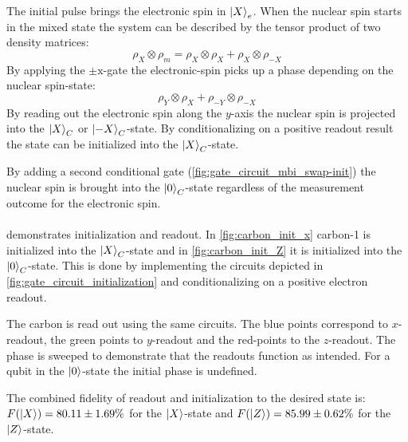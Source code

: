 The initial pulse brings the electronic spin in ${\left\vert{X}\right\rangle}_e$.
When the nuclear spin starts in the mixed state the system can be described by the tensor product of two density matrices:
\begin{equation}
    \rho_X \otimes \rho_m = \rho_X \otimes \rho_{X} +\rho_X \otimes \rho_{-X}
\end{equation}
By applying the $\pm{\mathrm{x}}$-gate  the electronic-spin picks up a phase depending on the nuclear spin-state:
\begin{equation}
     \rho_Y \otimes \rho_{X} +\rho_{-Y} \otimes \rho_{-X}
\end{equation}
By reading out the electronic spin along the $y$-axis the nuclear spin is projected into the ${\left\vert{X}\right\rangle}_C$ or ${\left\vert{-X}\right\rangle}_C$-state.
By conditionalizing on a positive readout result the state can be initialized into the ${\left\vert{X}\right\rangle}_C$-state.

By adding a second conditional gate (\cref{fig:gate_circuit_mbi_swap-init}) the nuclear spin is brought into the ${\left\vert{0}\right\rangle}_C$-state regardless of the measurement outcome for the electronic spin.

\paragraph{}
 demonstrates initialization and readout.
In \cref{fig:carbon_init_x} carbon-1 is initialized into the ${\left\vert{X}\right\rangle}_C$-state and in \cref{fig:carbon_init_Z} it is initialized into the ${\left\vert{0}\right\rangle}_C$-state.
This is done by implementing the circuits depicted in \cref{fig:gate_circuit_initialization} and conditionalizing on a positive electron readout.

The carbon is read out using the same circuits.
The blue points correspond to $x$-readout, the green points to $y$-readout and the red-points to the $z$-readout.
The phase is sweeped to demonstrate that the readouts function as intended.
For a qubit in the ${\left\vert{0}\right\rangle}$-state the initial phase is undefined.

The combined fidelity of readout and initialization to the desired state is: $F({\left\vert{X}\right\rangle}) = 80.11 \pm 1.69\% $ for the ${\left\vert{X}\right\rangle}$-state and $F({\left\vert{Z}\right\rangle}) = 85.99 \pm 0.62\%$ for the ${\left\vert{Z}\right\rangle}$-state.


